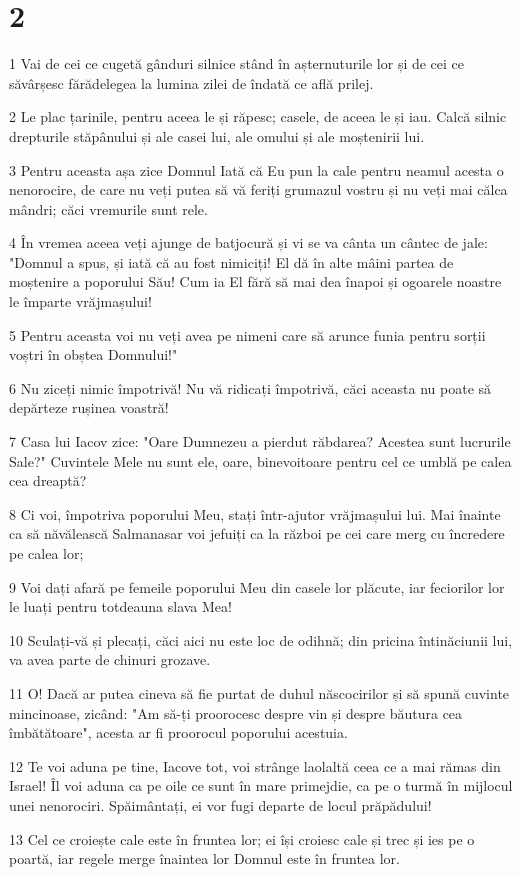 \chapter{2}

\par 1 Vai de cei ce cugetă gânduri silnice stând în așternuturile lor și de cei ce săvârșesc fărădelegea la lumina zilei de îndată ce află prilej.
\par 2 Le plac țarinile, pentru aceea le și răpesc; casele, de aceea le și iau. Calcă silnic drepturile stăpânului și ale casei lui, ale omului și ale moștenirii lui.
\par 3 Pentru aceasta așa zice Domnul Iată că Eu pun la cale pentru neamul acesta o nenorocire, de care nu veți putea să vă feriți grumazul vostru și nu veți mai călca mândri; căci vremurile sunt rele.
\par 4 În vremea aceea veți ajunge de batjocură și vi se va cânta un cântec de jale: "Domnul a spus, și iată că au fost nimiciți! El dă în alte mâini partea de moștenire a poporului Său! Cum ia El fără să mai dea înapoi și ogoarele noastre le împarte vrăjmașului!
\par 5 Pentru aceasta voi nu veți avea pe nimeni care să arunce funia pentru sorții voștri în obștea Domnului!"
\par 6 Nu ziceți nimic împotrivă! Nu vă ridicați împotrivă, căci aceasta nu poate să depărteze rușinea voastră!
\par 7 Casa lui Iacov zice: "Oare Dumnezeu a pierdut răbdarea? Acestea sunt lucrurile Sale?" Cuvintele Mele nu sunt ele, oare, binevoitoare pentru cel ce umblă pe calea cea dreaptă?
\par 8 Ci voi, împotriva poporului Meu, stați într-ajutor vrăjmașului lui. Mai înainte ca să năvălească Salmanasar voi jefuiți ca la război pe cei care merg cu încredere pe calea lor;
\par 9 Voi dați afară pe femeile poporului Meu din casele lor plăcute, iar feciorilor lor le luați pentru totdeauna slava Mea!
\par 10 Sculați-vă și plecați, căci aici nu este loc de odihnă; din pricina întinăciunii lui, va avea parte de chinuri grozave.
\par 11 O! Dacă ar putea cineva să fie purtat de duhul născocirilor și să spună cuvinte mincinoase, zicând: "Am să-ți proorocesc despre vin și despre băutura cea îmbătătoare", acesta ar fi proorocul poporului acestuia.
\par 12 Te voi aduna pe tine, Iacove tot, voi strânge laolaltă ceea ce a mai rămas din Israel! Îl voi aduna ca pe oile ce sunt în mare primejdie, ca pe o turmă în mijlocul unei nenorociri. Spăimântați, ei vor fugi departe de locul prăpădului!
\par 13 Cel ce croiește cale este în fruntea lor; ei își croiesc cale și trec și ies pe o poartă, iar regele merge înaintea lor Domnul este în fruntea lor.

